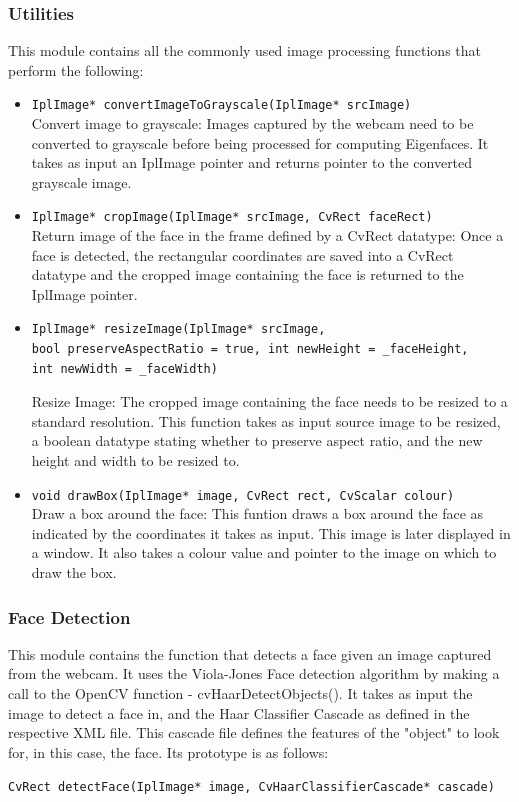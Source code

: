 \documentclass[12pt]{article}			%
\begin{document}
\subsubsection { Utilities }
This module contains all the commonly used image processing functions that perform the following:

\begin{itemize}
\item 
\verb+IplImage* convertImageToGrayscale(IplImage* srcImage)+\\
Convert image to grayscale: Images captured by the webcam need to be converted to grayscale before being processed for computing Eigenfaces. It takes as input an IplImage pointer and returns pointer to the converted grayscale image.
\item
\verb+IplImage* cropImage(IplImage* srcImage, CvRect faceRect)+\\
Return image of the face in the frame defined by a CvRect datatype: Once a face is detected, the rectangular coordinates are saved into a CvRect datatype and the cropped image containing the face is returned to the IplImage pointer.
\item
\begin{verbatim}
IplImage* resizeImage(IplImage* srcImage,
bool preserveAspectRatio = true, int newHeight = _faceHeight,
int newWidth = _faceWidth)
\end{verbatim}
Resize Image: The cropped image containing the face needs to be resized to a standard resolution. This function takes as input source image to be resized, a boolean datatype stating whether to preserve aspect ratio, and the new height and width to be resized to.
\item
\verb+void drawBox(IplImage* image, CvRect rect, CvScalar colour)+\\
Draw a box around the face: This funtion draws a box around the face as indicated by the coordinates it takes as input. This image is later displayed in a window. It also takes a colour value and pointer to the image on which to draw the box.
\end{itemize}

\subsubsection { Face Detection }
This module contains the function that detects a face given an image captured from the webcam. It uses the Viola-Jones Face detection algorithm by making a call to the OpenCV function - cvHaarDetectObjects(). It takes as input the image to detect a face in, and the Haar Classifier Cascade as defined in the respective XML file. This cascade file defines the features of the "object" to look for, in this case, the face. Its prototype is as follows:
\begin{center}
\verb+CvRect detectFace(IplImage* image, CvHaarClassifierCascade* cascade)+
\end{center}
\end{document}
